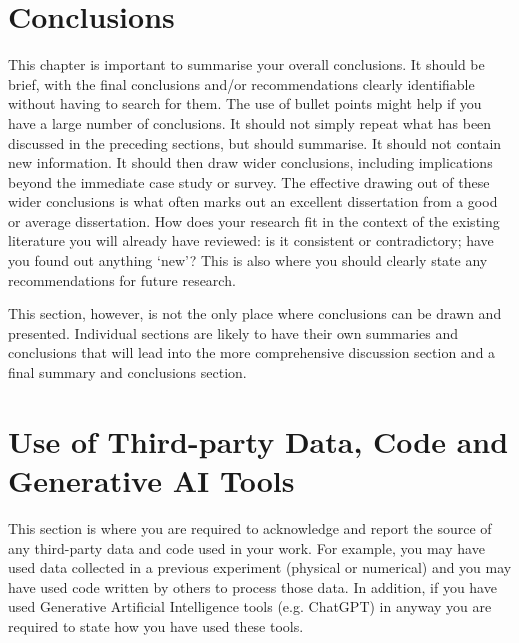 \documentclass[a4paper,12pt]{article}
\begin{document}
\clearpage


\section{Conclusions}
\label{sec:conclusions}


This chapter is important to summarise your overall conclusions. It should be brief, with the final
conclusions and/or recommendations clearly identifiable without having to search for them. The use
of bullet points might help if you have a large number of conclusions. It should not simply repeat
what has been discussed in the preceding sections, but should summarise. It should not contain new information. It should then draw wider conclusions, including implications beyond the immediate case study or survey. The effective drawing out of these wider conclusions is what often marks out an excellent dissertation from a good or average dissertation. How does your research fit in the context of the existing literature you will already have reviewed: is it consistent or contradictory; have you found out anything `new'? This is also where you should clearly state any recommendations for future research.

This section, however, is not the only place where conclusions can be drawn and presented.  Individual sections are likely to have their own summaries and conclusions that will lead into the more comprehensive discussion section and a final summary and conclusions section.


\clearpage

\section{Use of Third-party Data, Code and Generative AI Tools}
\label{sec:DCG_Usaage}

This section is where you are required to acknowledge and report the source of any third-party data and code used in your work. For example, you may have used data collected in a previous experiment (physical or numerical) and you may have used code written by others to process those data. In addition, if you have used Generative Artificial Intelligence tools (e.g. ChatGPT) in anyway you are required to state how you have used these tools.
\end{document}
